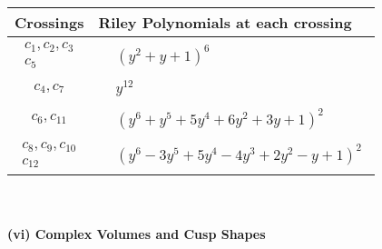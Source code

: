\documentclass[1p]{elsarticle_modified}
\theoremstyle{definition}
\begin{document}
\begin{tabular}{m{50pt}|m{274pt}}
Crossings & \hspace{64pt}Riley Polynomials at each crossing \\
\hline $$\begin{aligned}c_{1},c_{2},c_{3}\\c_{5}\end{aligned}$$&$\begin{aligned}
&(y^2+y+1)^6
\end{aligned}$\\
\hline $$\begin{aligned}c_{4},c_{7}\end{aligned}$$&$\begin{aligned}
&y^{12}
\end{aligned}$\\
\hline $$\begin{aligned}c_{6},c_{11}\end{aligned}$$&$\begin{aligned}
&(y^6+y^5+5 y^4+6 y^2+3 y+1)^2
\end{aligned}$\\
\hline $$\begin{aligned}c_{8},c_{9},c_{10}\\c_{12}\end{aligned}$$&$\begin{aligned}
&(y^6-3 y^5+5 y^4-4 y^3+2 y^2- y+1)^2
\end{aligned}$\\
\hline
\end{tabular}\\~\\
\newpage\flushleft \textbf{(vi) Complex Volumes and Cusp Shapes}
\end{document}
